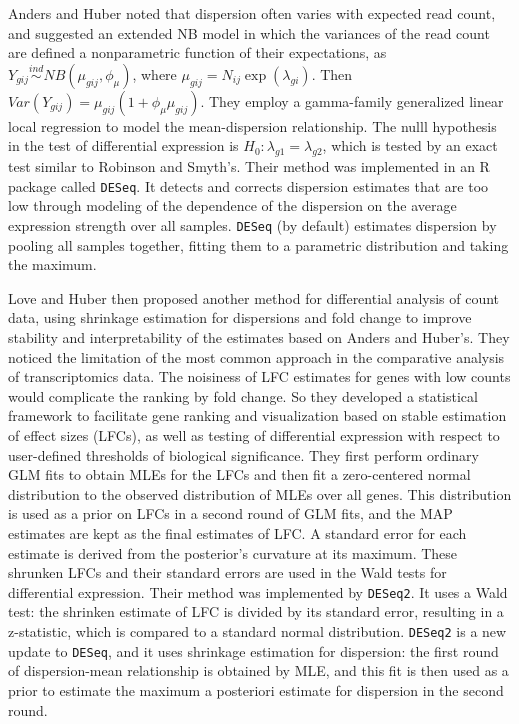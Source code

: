 Anders and Huber \citep{anders2010differential} noted that dispersion often varies with expected read count, and suggested an extended NB model in which the variances of the read count are defined a nonparametric function of their expectations, as $Y_{gij} \stackrel{ind}{\sim} NB(\mu_{gij}, \phi_\mu)$, where $\mu_{gij}=N_{ij}\exp(\lambda_{gi})$. Then $Var(Y_{gij}) = \mu_{gij}(1+\phi_\mu \mu_{gij})$. They employ a gamma-family generalized linear local regression to model the mean-dispersion relationship. The nulll hypothesis in the test of differential expression is $H_0: \lambda_{g1} = \lambda_{g2}$, which is tested by an exact test similar to Robinson and Smyth's. Their method was implemented in an R package called {\tt DESeq}. It detects and corrects dispersion estimates that are too low through modeling of the dependence of the dispersion on the average expression strength over all samples. {\tt DESeq} (by default) estimates dispersion by pooling all samples together, fitting them to a parametric distribution and taking the maximum.

Love and Huber \citep{love2014moderated} then proposed another method for differential analysis of count data, using shrinkage estimation for dispersions and fold change to improve stability and interpretability of the estimates based on Anders and Huber's. They noticed the limitation of the most common approach in the comparative analysis of transcriptomics data. The noisiness of LFC estimates for genes with low counts would complicate the ranking by fold change. So they developed a statistical framework to facilitate gene ranking and visualization based on stable estimation of effect sizes (LFCs), as well as testing of differential expression with respect to user-defined thresholds of biological significance. They first perform ordinary GLM fits to obtain MLEs for the LFCs and then fit a zero-centered normal distribution to the observed distribution of MLEs over all genes. This distribution is used as a prior on LFCs in a second round of GLM fits, and the MAP estimates are kept as the final estimates of LFC. A standard error for each estimate is derived from the posterior's curvature at its maximum. These shrunken LFCs and their standard errors are used in the Wald tests for differential expression. Their method was implemented by {\tt DESeq2}. It uses a Wald test: the shrinken estimate of LFC is divided by its standard error, resulting in a z-statistic, which is compared to a standard normal distribution. {\tt DESeq2} is a new update to {\tt DESeq}, and it uses shrinkage estimation for dispersion: the first round of dispersion-mean relationship is obtained by MLE, and this fit is then used as a prior to estimate the maximum a posteriori estimate for dispersion in the second round. 

